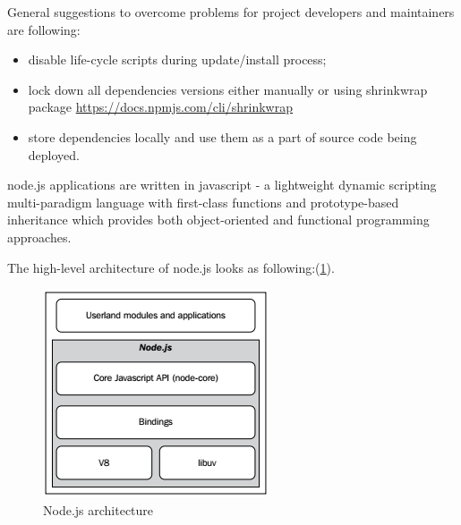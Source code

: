 General suggestions to overcome problems for project developers and maintainers are following:
\begin{itemize}
	\item disable life-cycle scripts during update/install process;
	\item lock down all dependencies versions either manually or using shrinkwrap package \url{https://docs.npmjs.com/cli/shrinkwrap}
	\item store dependencies locally and use them as a part of source code being deployed.
\end{itemize}


node.js applications are written in javascript - a lightweight dynamic scripting multi-paradigm language with first-class functions and prototype-based inheritance which provides both object-oriented and functional programming approaches\cite{mdnJS}.


 
The high-level architecture of node.js looks as following:(\ref{fig:nodeArch}). 
\begin{figure}[ht]
  	\label{fig:nodeArch}
    \centering
    \includegraphics[scale=1.0]{grafiken/nodeArchitecture.png}
     \caption{Node.js architecture \cite{nodejsbook}}
  \end{figure}


